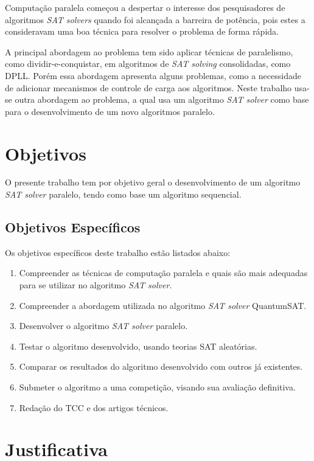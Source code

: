 \documentclass{ufsc-thesis}
\begin{document}
Computação paralela\cite{Kumar2002} começou a despertar o interesse dos pesquisadores 
de algoritmos \textit{SAT solvers} quando foi alcançada a barreira de potência, 
pois estes a consideravam uma boa técnica para resolver o problema de 
forma rápida. 

A principal abordagem ao problema tem sido aplicar técnicas de paralelismo, 
como dividir-e-conquistar, em algoritmos de \textit{SAT solving} consolidadas, 
como DPLL. Porém essa abordagem apresenta alguns problemas, como a 
necessidade de adicionar mecanismos de controle de carga aos algoritmos. 
Neste trabalho usa-se outra abordagem ao problema, a qual usa um algoritmo 
\textit{SAT solver} como base para o desenvolvimento de um novo algoritmos paralelo.


\section{Objetivos}
\label{sec:objets}

O presente trabalho tem por objetivo geral o desenvolvimento de um 
algoritmo \textit{SAT solver} paralelo, tendo como base um algoritmo sequencial.

\subsection{Objetivos Específicos}

Os objetivos específicos deste trabalho estão listados abaixo:

\begin{enumerate}
  \item Compreender as técnicas de computação paralela e quais são mais adequadas para se utilizar no algoritmo \textit{SAT solver}.
  \item Compreender a abordagem utilizada no algoritmo \textit{SAT solver} QuantumSAT.
  \item Desenvolver o algoritmo \textit{SAT solver} paralelo.
  \item Testar o algoritmo desenvolvido, usando teorias SAT aleatórias.
  \item Comparar os resultados do algoritmo desenvolvido com outros já existentes.
  \item Submeter o algoritmo a uma competição, visando sua avaliação definitiva.
  \item Redação do TCC e dos artigos técnicos.
\end{enumerate}

\section{Justificativa}
\label{sec:just}
\end{document}
